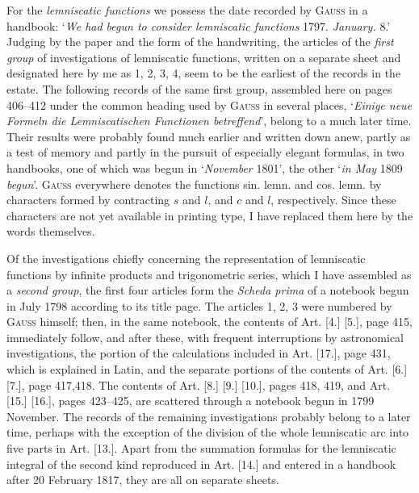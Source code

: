 \medskip
For the \textit{lemniscatic functions} we possess the date recorded by \textsc{Gauss} in a handbook: `\textit{We had begun to consider lemniscatic functions} 1797. \textit{January.} 8.' Judging by the paper and the form of the handwriting, the articles of the \textit{first group} of investigations of lemniscatic functions, written on a separate sheet and designated here by me as 1, 2, 3, 4, seem to be the earliest of the records in the estate. The following records of the same first group, assembled here on pages 406--412 under the common heading used by \textsc{Gauss} in several places, `\textit{Einige neue Formeln die Lemniscatischen Functionen betreffend}', belong to a much later time. Their results were probably found much earlier and written down anew, partly as a test of memory and partly in the pursuit of especially elegant formulas, in two handbooks, one of which was begun in `\textit{November} 1801', the other `\textit{in May} 1809 \textit{begun}'. \textsc{Gauss} everywhere denotes the functions sin. lemn. and cos. lemn. by characters formed by contracting \(s\) and \(l\), and \(c\) and \(l\), respectively. Since these characters are not yet available in printing type, I have replaced them here by the words themselves.


Of the investigations chiefly concerning the representation of lemniscatic functions by infinite products and trigonometric series, which I have assembled as a \textit{second group}, the first four articles form the \textit{Scheda prima} of a notebook begun in July 1798 according to its title page. The articles 1, 2, 3 were numbered by \textsc{Gauss} himself; then, in the same notebook, the contents of Art. [4.] [5.], page 415, immediately follow, and after these, with frequent interruptions by astronomical investigations, the portion of the calculations included in Art. [17.], page 431, which is explained in Latin, and the separate portions of the contents of Art. [6.] [7.], page 417,418. The contents of Art. [8.] [9.] [10.], pages 418, 419, and Art. [15.] [16.], pages 423--425, are scattered through a notebook begun in 1799 November. The records of the remaining investigations probably belong to a later time, perhaps with the exception of the division of the whole lemniscatic arc into five parts in Art. [13.]. Apart from the summation formulas for the lemniscatic integral of the second kind reproduced in Art. [14.] and entered in a handbook after 20 February 1817, they are all on separate sheets.

